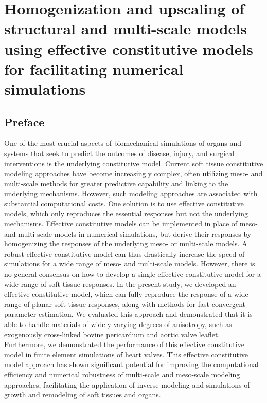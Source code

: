 \chapter{Homogenization and upscaling of structural and multi-scale models using effective constitutive models for facilitating numerical simulations}

\section*{Preface}
%

One of the most crucial aspects of biomechanical simulations of organs and systems that seek to predict the outcomes of disease, injury, and surgical interventions is the underlying constitutive model. Current soft tissue constitutive modeling approaches have become increasingly complex, often utilizing meso- and multi-scale methods for greater predictive capability and linking to the underlying mechanisms. However, such modeling approaches are associated with substantial computational costs. One solution is to use effective constitutive models, which only reproduces the essential responses but not the underlying mechanisms. Effective constitutive models can be implemented in place of meso- and multi-scale models in numerical simulations, but derive their responses by homogenizing the responses of the underlying meso- or multi-scale models. A robust effective constitutive model can thus drastically increase the speed of simulations for a wide range of meso- and multi-scale models. However, there is no general consensus on how to develop a single effective constitutive model for a wide range of soft tissue responses. In the present study, we developed an effective constitutive model, which can fully reproduce the response of a wide range of planar soft tissue responses, along with methods for fast-convergent parameter estimation. We evaluated this approach and demonstrated that it is able to handle materials of widely varying degrees of anisotropy, such as exogenously cross-linked bovine pericardium and aortic valve leaflet. Furthermore, we demonstrated the performance of this effective constitutive model in finite element simulations of heart valves. This effective constitutive model approach has shown significant potential for improving the computational efficiency and numerical robustness of multi-scale and meso-scale modeling approaches, facilitating the application of inverse modeling and simulations of growth and remodeling of soft tissues and organs.

